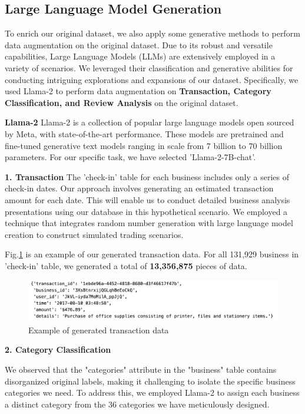 \documentclass[runningheads]{llncs}
\begin{document}
\subsection{Large Language Model Generation}
To enrich our original dataset, we also apply some generative methods to perform data augmentation on the original dataset. Due to its robust and versatile capabilities, Large Language Models (LLMs) are extensively employed in a variety of scenarios. We leveraged their classification and generative abilities for conducting intriguing explorations and expansions of our dataset. Specifically, we used Llama-2 to perform data augmentation on \textbf{Transaction, Category Classification, and Review Analysis} on the original dataset.

\textbf{Llama-2}
Llama-2 is a collection of popular large language models open sourced by Meta, with state-of-the-art performance. These models are pretrained and fine-tuned generative text models ranging in scale from 7 billion to 70 billion parameters. For our specific task, we have selected 'Llama-2-7B-chat'.

\textbf{1. Transaction}
The 'check-in' table for each business includes only a series of check-in dates. Our approach involves generating an estimated transaction amount for each date. This will enable us to conduct detailed business analysis presentations using our database in this hypothetical scenario. We employed a technique that integrates random number generation with large language model creation to construct simulated trading scenarios.

Fig.\ref{fig:transaction} is an example of our generated transaction data. For all 131,929 business in 'check-in' table, we generated a total of \textbf{13,356,875} pieces of data.

\begin{figure}
    \centering
    \includegraphics[width=1 \linewidth]{figs/transaction_example.png}
    \caption{Example of generated transaction data}
    \label{fig:transaction}
\end{figure}


\textbf{2. Category Classification}

We observed that the "categories" attribute in the "business" table contains disorganized original labels, making it challenging to isolate the specific business categories we need. To address this, we employed Llama-2 to assign each business a distinct category from the 36 categories we have meticulously designed.
\end{document}
